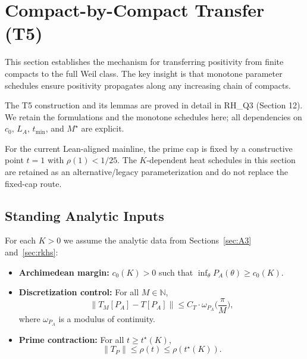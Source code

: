
\section{Compact-by-Compact Transfer (T5)}\label{sec:T5}

This section establishes the mechanism for transferring positivity from finite compacts to the full Weil class. The key insight is that monotone parameter schedules ensure positivity propagates along any increasing chain of compacts.

\begin{remark}
The T5 construction and its lemmas are proved in detail in RH\_Q3 (Section 12). We retain the formulations and the monotone schedules here; all dependencies on $c_0$, $L_A$, $t_{\min}$, and $M^\star$ are explicit.
\end{remark}

\begin{remark}
For the current Lean-aligned mainline, the prime cap is fixed by a constructive point $t=1$ with $\rho(1)<1/25$.
The $K$-dependent heat schedules in this section are retained as an alternative/legacy parameterization and do not replace the fixed-cap route.
\end{remark}

\subsection{Standing Analytic Inputs}

For each $K > 0$ we assume the analytic data from Sections~\ref{sec:A3} and~\ref{sec:rkhs}:

\begin{itemize}
  \item[\textbf{(A3.a)}] \textbf{Archimedean margin:} $c_0(K) > 0$ such that $\inf_\theta P_A(\theta) \geq c_0(K)$.

  \item[\textbf{(A3.b)}] \textbf{Discretization control:} For all $M \in \mathbb{N}$,
  \begin{equation}
    \|T_M[P_A] - T[P_A]\| \leq C_T \cdot \omega_{P_A}\!\Big(\frac{\pi}{M}\Big),
  \end{equation}
  where $\omega_{P_A}$ is a modulus of continuity.

  \item[\textbf{(RKHS)}] \textbf{Prime contraction:} For all $t \geq t^\star(K)$,
  \begin{equation}
    \|T_P\| \leq \rho(t) \leq \rho(t^\star(K)).
  \end{equation}
\end{itemize}

